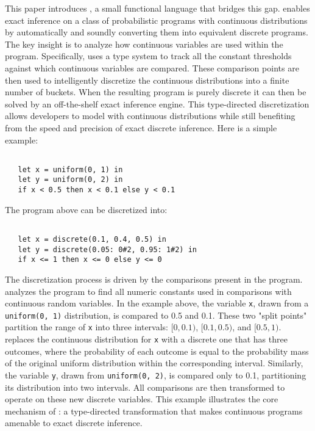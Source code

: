 \documentclass[acmsmall,screen,dvipsnames,x11names,nonacm,anonymous,review]{acmart}
\newcommand{\Slice}{\text{\scshape Slice}\xspace}
\begin{document}
This paper introduces \Slice, a small functional language that bridges this gap. \Slice enables exact inference on a class of probabilistic programs with continuous distributions by automatically and soundly converting them into equivalent discrete programs. The key insight is to analyze how continuous variables are used within the program. Specifically, \Slice uses a type system to track all the constant thresholds against which continuous variables are compared. These comparison points are then used to intelligently discretize the continuous distributions into a finite number of buckets. When the resulting program is purely discrete it can then be solved by an off-the-shelf exact inference engine. This type-directed discretization allows developers to model with continuous distributions while still benefiting from the speed and precision of exact discrete inference. Here is a simple example:

\begin{lstlisting}

   let x = uniform(0, 1) in
   let y = uniform(0, 2) in
   if x < 0.5 then x < 0.1 else y < 0.1

\end{lstlisting}\vspace{1em}

\noindent The program above can be discretized into:

\begin{lstlisting}

   let x = discrete(0.1, 0.4, 0.5) in
   let y = discrete(0.05: 0#2, 0.95: 1#2) in
   if x <= 1 then x <= 0 else y <= 0

\end{lstlisting}\vspace{1em}

The discretization process is driven by the comparisons present in the program. \Slice analyzes the program to find all numeric constants used in comparisons with continuous random variables. In the example above, the variable \texttt{x}, drawn from a \texttt{uniform(0, 1)} distribution, is compared to 0.5 and 0.1. These two "split points" partition the range of \texttt{x} into three intervals: $[0, 0.1)$, $[0.1, 0.5)$, and $[0.5, 1)$. \Slice replaces the continuous distribution for \texttt{x} with a discrete one that has three outcomes, where the probability of each outcome is equal to the probability mass of the original uniform distribution within the corresponding interval. Similarly, the variable \texttt{y}, drawn from \texttt{uniform(0, 2)}, is compared only to 0.1, partitioning its distribution into two intervals. All comparisons are then transformed to operate on these new discrete variables. This example illustrates the core mechanism of \Slice: a type-directed transformation that makes continuous programs amenable to exact discrete inference.
\end{document}
